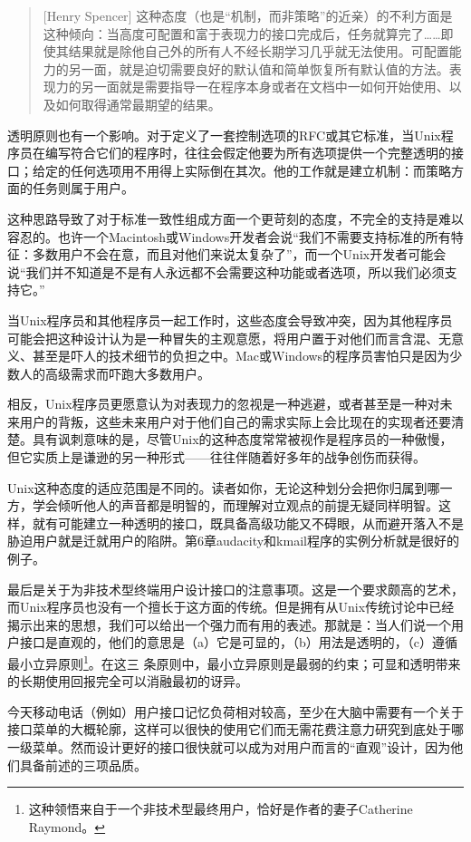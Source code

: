 \documentclass[12pt,oneside]{book}
\begin{document}
\begin{common-format}
\begin{quote}[Henry Spencer]
这种态度（也是“机制，而非策略”的近亲）的不利方面是这种倾向：当高度可配置和富于表现力的接口完成后，任务就算完了……即使其结果就是除他自己外的所有人不经长期学习几乎就无法使用。可配置能力的另一面，就是迫切需要良好的默认值和简单恢复所有默认值的方法。表现力的另一面就是需要指导一在程序本身或者在文档中一如何开始使用、以及如何取得通常最期望的结果。
\end{quote}

透明原则也有一个影响。对于定义了一套控制选项的RFC或其它标准，当Unix程序员在编写符合它们的程序时，往往会假定他要为所有选项提供一个完整透明的接口；给定的任何选项用不用得上实际倒在其次。他的工作就是建立机制：而策略方面的任务则属于用户。

这种思路导致了对于标准一致性组成方面一个更苛刻的态度，不完全的支持是难以容忍的。也许一个Macintosh或Windows开发者会说“我们不需要支持标准的所有特征：多数用户不会在意，而且对他们来说太复杂了”，而一个Unix开发者可能会说“我们并不知道是不是有人永远都不会需要这种功能或者选项，所以我们必须支持它。”

当Unix程序员和其他程序员一起工作时，这些态度会导致冲突，因为其他程序员可能会把这种设计认为是一种冒失的主观意愿，将用户置于对他们而言含混、无意义、甚至是吓人的技术细节的负担之中。Mac或Windows的程序员害怕只是因为少数人的高级需求而吓跑大多数用户。

相反，Unix程序员更愿意认为对表现力的忽视是一种逃避，或者甚至是一种对未来用户的背叛，这些未来用户对于他们自己的需求实际上会比现在的实现者还要清楚。具有讽刺意味的是，尽管Unix的这种态度常常被视作是程序员的一种傲慢，但它实质上是谦逊的另一种形式——往往伴随着好多年的战争创伤而获得。

Unix这种态度的适应范围是不同的。读者如你，无论这种划分会把你归属到哪一方，学会倾听他人的声音都是明智的，而理解对立观点的前提无疑同样明智。这样，就有可能建立一种透明的接口，既具备高级功能又不碍眼，从而避开落入不是胁迫用户就是迁就用户的陷阱。第6章audacity和kmail程序的实例分析就是很好的例子。

最后是关于为非技术型终端用户设计接口的注意事项。这是一个要求颇高的艺术，而Unix程序员也没有一个擅长于这方面的传统。但是拥有从Unix传统讨论中已经揭示出来的思想，我们可以给出一个强力而有用的表述。那就是：当人们说一个用户接口是直观的，他们的意思是（a）它是可显的，（b）用法是透明的，（c）遵循最小立异原则\footnote{这种领悟来自于一个非技术型最终用户，恰好是作者的妻子Catherine Raymond。}。在这三
条原则中，最小立异原则是最弱的约束；可显和透明带来的长期使用回报完全可以消融最初的讶异。

今天移动电话（例如）用户接口记忆负荷相对较高，至少在大脑中需要有一个关于接口菜单的大概轮廓，这样可以很快的使用它们而无需花费注意力研究到底处于哪一级菜单。然而设计更好的接口很快就可以成为对用户而言的“直观”设计，因为他们具备前述的三项品质。


\end{common-format}
\end{document}

